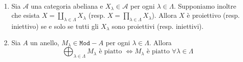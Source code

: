 \begin{proposition}{} \(\) 
\begin{enumerate}[label = \arabic*.]
    \item Sia \(\mathcal{A}\) una categoria abeliana e \(X_\lambda \in
        \mathcal{A}\) per ogni \(\lambda \in \Lambda\). Supponiamo inoltre che
        esista \(X = \coprod_{\lambda \in \Lambda} X_\lambda\) (resp. \(X = \prod_{\lambda
        \in \Lambda} X_\lambda\)). Allora \(X\) è proiettivo (resp. iniettivo) se
        e solo se tutti gli \(X_\lambda\) sono proiettivi (resp. iniettivi).
    \item Sia \(A\) un anello, \(M_\lambda \in \mathtt{Mod}-A \) per ogni
        \(\lambda \in \Lambda\). Allora 
        \[
          \bigoplus_{\lambda \in \Lambda} M_\lambda \text{ è piatto } \iff
          M_\lambda \text{ è piatto } \forall  \lambda \in \Lambda
        \]
\end{enumerate}
\end{proposition}
